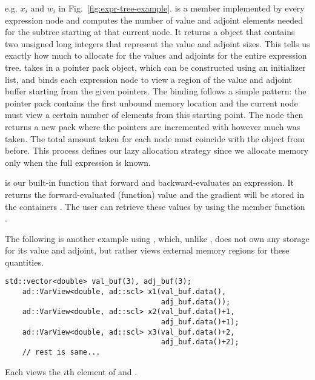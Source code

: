e.g. $x_i$ and $w_i$ in Fig.~\ref{fig:expr-tree-example}.
 is a member implemented by every expression node
and computes the number of value and adjoint elements
needed for the subtree starting at that current node.
It returns a  object that contains two unsigned long integers
that represent the value and adjoint sizes.
This tells us exactly how much to allocate for the values and adjoints 
for the entire expression tree.
 takes in a pointer pack object,
which can be constructed using an initializer list,
and binds each expression node to view 
a region of the value and adjoint buffer starting from the given pointers.
The binding follows a simple pattern:
the pointer pack contains the first unbound memory location and 
the current node must view a certain number of elements from this starting point.
The node then returns a new pack where the pointers are incremented with however much was taken.
The total amount taken for each node must coincide with the  object from before.
This process defines our lazy allocation strategy
since we allocate memory only when the full expression is known.

 is our built-in function that forward and backward-evaluates an expression.
It returns the forward-evaluated (function) value
and the gradient will be stored in the containers .
The user can retrieve these values by using the member function .

The following is another example using ,
which, unlike , does not own any storage for its value and adjoint,
but rather views external memory regions for these quantities.
\begin{lstlisting}[style=customcpp]
    std::vector<double> val_buf(3), adj_buf(3);
    ad::VarView<double, ad::scl> x1(val_buf.data(), 
                                    adj_buf.data());
    ad::VarView<double, ad::scl> x2(val_buf.data()+1, 
                                    adj_buf.data()+1);
    ad::VarView<double, ad::scl> x3(val_buf.data()+2, 
                                    adj_buf.data()+2);
    // rest is same...
\end{lstlisting}
Each  views the $i$th element of  and .

